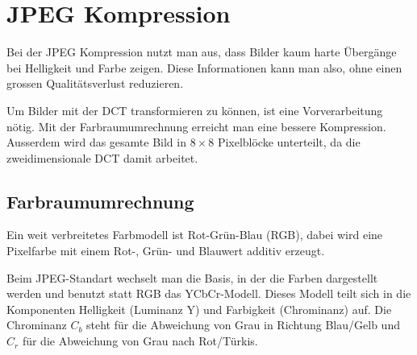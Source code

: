 %
%
%
%
\section{JPEG Kompression
\label{jpeg:section:kompjpeg}}
Bei der JPEG Kompression nutzt man aus, dass Bilder kaum harte Übergänge bei Helligkeit und Farbe zeigen.
Diese Informationen kann man also, ohne einen grossen Qualitätsverlust reduzieren. 

Um Bilder mit der DCT transformieren zu können, ist eine Vorverarbeitung nötig. 
Mit der Farbraumumrechnung erreicht man eine bessere Kompression.
Ausserdem wird das gesamte Bild in \(8\times8\) Pixelblöcke unterteilt, da die zweidimensionale DCT damit arbeitet.

\subsection{Farbraumumrechnung
\label{jpeg:subsection:farbraumumrechnung}}
Ein weit verbreitetes Farbmodell ist Rot-Grün-Blau (RGB), dabei wird eine Pixelfarbe mit einem Rot-, Grün- und Blauwert additiv erzeugt.

Beim JPEG-Standart wechselt man die Basis, in der die Farben dargestellt werden und benutzt statt RGB das YCbCr-Modell.
Dieses Modell teilt sich in die Komponenten Helligkeit (Luminanz Y) und Farbigkeit (Chrominanz) auf.
Die Chrominanz \(C_b\) steht für die Abweichung von Grau in Richtung Blau/Gelb und \(C_r\) für die Abweichung von Grau nach Rot/Türkis.


